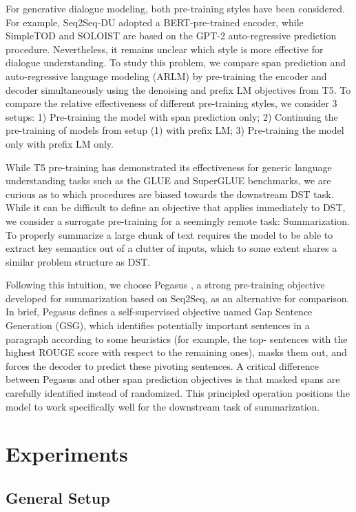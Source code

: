 \documentclass[11pt]{article}
\begin{document}
For generative dialogue modeling, both pre-training styles have been considered. For example, Seq2Seq-DU \cite{feng2020sequencetosequence} adopted a BERT-pre-trained encoder, while SimpleTOD \cite{hosseiniasl2020simple} and SOLOIST \cite{peng2021soloist} are based on the GPT-2 auto-regressive prediction procedure. Nevertheless, it remains unclear which style is more effective for dialogue understanding. To study this problem, we compare span prediction and auto-regressive language modeling (ARLM) by pre-training the encoder and decoder simultaneously using the denoising and prefix LM objectives from T5. To compare the relative effectiveness of different pre-training styles, we consider 3 setups: 1) Pre-training the model with span prediction only; 2) Continuing the pre-training  of models from setup (1) with prefix LM; 3) Pre-training the model only with prefix LM only.

While T5 pre-training has demonstrated its effectiveness for generic language understanding tasks such as the GLUE and SuperGLUE benchmarks, we are curious as to which procedures are biased towards the downstream DST task. While it can be difficult to define an objective that applies immediately to DST, we consider a surrogate pre-training for a seemingly remote task: Summarization. To properly summarize a large chunk of text requires the model to be able to extract key semantics out of a clutter of inputs, which to some extent shares a similar problem structure as DST.

Following this intuition, we choose Pegasus \cite{zhang20ae}, a strong pre-training objective developed for summarization based on Seq2Seq, as an alternative for comparison. In brief, Pegasus defines a self-supervised objective named Gap Sentence Generation (GSG), which identifies potentially important sentences in a paragraph according to some heuristics (for example, the top- sentences with the highest ROUGE score with respect to the remaining ones), masks them out, and forces the decoder to predict these pivoting sentences. A critical difference between Pegasus and other span prediction objectives is that masked spans are carefully identified instead of randomized. This principled operation positions the model to work specifically well for the downstream task of summarization.


\section{Experiments}

\subsection{General Setup}
\end{document}

